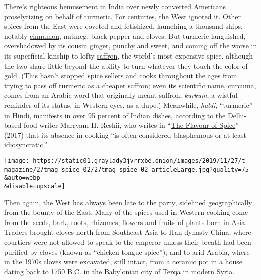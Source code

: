 There's righteous bemusement in India over newly converted Americans
proselytizing on behalf of turmeric. For centuries, the West ignored it.
Other spices from the East were coveted and fetishized, launching a
thousand ships, notably
\href{https://www.nytimes3xbfgragh.onion/2015/01/29/t-magazine/cinnamon-st-lucia-lamb-curry-recipe.html}{cinnamon},
nutmeg, black pepper and cloves. But turmeric languished, overshadowed
by its cousin ginger, punchy and sweet, and coming off the worse in its
superficial kinship to lofty
\href{https://www.nytimes3xbfgragh.onion/2015/12/30/dining/saffron-iran.html}{saffron},
the world's most expensive spice, although the two share little beyond
the ability to turn whatever they touch the color of gold. (This hasn't
stopped spice sellers and cooks throughout the ages from trying to pass
off turmeric as a cheaper saffron; even its scientific name, curcuma,
comes from an Arabic word that originally meant saffron, \emph{kurkum},
a wistful reminder of its status, in Western eyes, as a dupe.)
Meanwhile, \emph{haldi}, ``turmeric'' in Hindi, manifests in over 95
percent of Indian dishes, according to the Delhi-based food writer
Marryam H. Reshii, who writes in
``\href{http://marryamhreshii.com/about-marryamhreshii/books/the-flavour-of-spice/}{The
Flavour of Spice}'' (2017) that its absence in cooking ``is often
considered blasphemous or at least idiosyncratic.''

\texttt{[image: https://static01.graylady3jvrrxbe.onion/images/2019/11/27/t-magazine/27tmag-spice-02/27tmag-spice-02-articleLarge.jpg?quality=75\\\&auto=webp\\\&disable=upscale]}

Then again, the West has always been late to the party, sidelined
geographically from the bounty of the East. Many of the spices used in
Western cooking come from the seeds, bark, roots, rhizomes, flowers and
fruits of plants born in Asia. Traders brought cloves north from
Southeast Asia to Han dynasty China, where courtiers were not allowed to
speak to the emperor unless their breath had been purified by cloves
(known as ``chicken-tongue spice''); and to arid Arabia, where in the
1970s cloves were excavated, still intact, from a ceramic pot in a house
dating back to 1750 B.C. in the Babylonian city of Terqa in modern
Syria.

